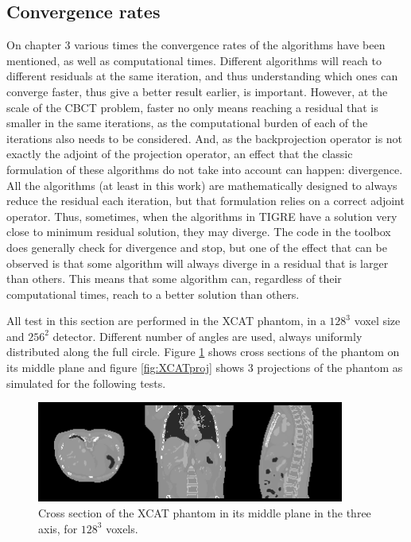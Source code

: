 \subsection{Convergence rates}

On chapter 3 various times the convergence rates of the algorithms have been mentioned, as well as computational times. Different algorithms will reach to different residuals at the same iteration, and thus understanding which ones can converge faster, thus give a better result earlier, is important. However, at the scale of the CBCT problem, faster no only means reaching a residual that is smaller in the same iterations, as the computational burden of each of the iterations also needs to be considered. And, as the backprojection operator is not exactly the adjoint of the projection operator, an effect that the classic formulation of these algorithms do not take into account can happen: divergence. All the algorithms (at least in this work) are mathematically designed to always reduce the residual each iteration, but that formulation relies on a correct adjoint operator. Thus, sometimes, when the algorithms in TIGRE have a solution very close to minimum residual solution, they may diverge. The code in the toolbox does generally check for divergence and stop, but one of the effect that can be observed is that some algorithm will always diverge in a residual that is larger than others. This means that some algorithm can, regardless of their computational times, reach to a better solution than others.

All test in this section are performed in the XCAT phantom\cite{XCAT}, in a $128^3$ voxel size and $256^2$ detector. Different number of angles are used, always uniformly distributed along the full circle. Figure \ref{fig:XCAT} shows cross sections of the phantom on its middle plane and figure \ref{fig:XCATproj} shows 3 projections of the phantom as simulated for the following tests. 

\begin{figure}[h]
\begin{center}

\includegraphics[width=0.9\textwidth]{Applications/XCAT.png} 
\end{center}

\caption[Cross section of the XCAT phantom]{\label{fig:XCAT} Cross section of the XCAT phantom in its middle plane in the three axis, for $128^3$ voxels.} 
\end{figure}

